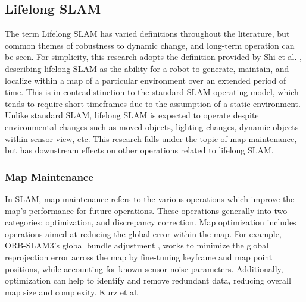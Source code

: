 \subsection{Lifelong SLAM}

The term Lifelong SLAM has varied definitions throughout the literature, but common themes of robustness to dynamic change, and long-term operation can be seen. For simplicity, this research adopts the definition provided by Shi et al. \cite{shiAreWeReady2020}, describing lifelong SLAM as the ability for a robot to generate, maintain, and localize within a map of a particular environment over an extended period of time. This is in contradistinction to the standard SLAM operating model, which tends to require short timeframes due to the assumption of a static environment. Unlike standard SLAM, lifelong SLAM is expected to operate despite environmental changes such as moved objects, lighting changes, dynamic objects within sensor view, etc. This research falls under the topic of map maintenance, but has downstream effects on other operations related to lifelong SLAM.

\subsubsection{Map Maintenance}

In SLAM, map maintenance refers to the various operations which improve the map's performance for future operations. These operations generally into two categories: optimization, and discrepancy correction. Map optimization includes operations aimed at reducing the global error within the map. For example, ORB-SLAM3's global bundle adjustment \cite{camposORBSLAM3AccurateOpenSource2021}, works to minimize the global reprojection error across the map by fine-tuning keyframe and map point positions, while accounting for known sensor noise parameters. Additionally, optimization can help to identify and remove redundant data, reducing overall map size and complexity. Kurz et al. 